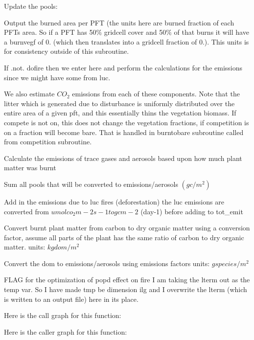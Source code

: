 Update the pools\+:

Output the burned area per P\+F\+T (the units here are burned fraction of each P\+F\+Ts area. So if a P\+F\+T has 50\% gridcell cover and 50\% of that burns it will have a burnvegf of 0. (which then translates into a gridcell fraction of 0.). This units is for consistency outside of this subroutine.

If .not. dofire then we enter here and perform the calculations for the emissions since we might have some from luc.

We also estimate $CO_2$ emissions from each of these components. Note that the litter which is generated due to disturbance is uniformly distributed over the entire area of a given pft, and this essentially thins the vegetation biomass. If compete is not on, this does not change the vegetation fractions, if competition is on a fraction will become bare. That is handled in burntobare subroutine called from competition subroutine.

Calculate the emissions of trace gases and aerosols based upon how much plant matter was burnt

Sum all pools that will be converted to emissions/aerosols $(g c/m^2)$

Add in the emissions due to luc fires (deforestation) the luc emissions are converted from $umol co_2 m-2 s-1 to g c m-2$ (day-\/1) before adding to tot\+\_\+emit

Convert burnt plant matter from carbon to dry organic matter using a conversion factor, assume all parts of the plant has the same ratio of carbon to dry organic matter. units\+: $kg dom / m^2$

Convert the dom to emissions/aerosols using emissions factors units\+: $g species / m^2$

F\+L\+A\+G for the optimization of popd effect on fire I am taking the lterm out as the \textquotesingle{}temp\textquotesingle{} var. So I have made tmp be dimension ilg and I overwrite the lterm (which is written to an output file) here in its place. 

Here is the call graph for this function\+:




Here is the caller graph for this function\+:


